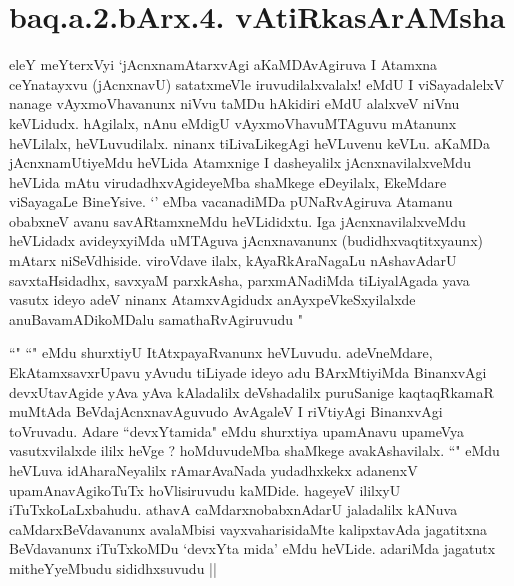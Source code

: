 \section*{baq.a.2.bArx.4. vAtiRkasArAMsha}


\begin{center}
\end{center}


\begin{artha}
eleY meYterxVyi `jAcnxnamAtarxvAgi aKaMDAvAgiruva I Atamxna ceYnatayxvu 
(jAcnxnavU) satatxmeVle iruvudilalxvalalx! eMdU I viSayadalelxV nanage 
vAyxmoVhavanunx niVvu taMDu hAkidiri eMdU alalxveV niVnu keVLidudx. hAgilalx, 
nAnu eMdigU vAyxmoVhavuMTAguvu mAtanunx heVLilalx, heVLuvudilalx. ninanx 
tiLivaLikegAgi heVLuvenu keVLu. aKaMDa jAcnxnamUtiyeMdu heVLida Atamxnige I 
dasheyalilx jAcnxnavilalxveMdu heVLida mAtu virudadhxvAgideyeMba shaMkege 
eDeyilalx, EkeMdare viSayagaLe BineYsive. `\stext' eMba vacanadiMDa 
pUNaRvAgiruva Atamanu obabxneV avanu savARtamxneMdu heVLididxtu. Iga 
jAcnxnavilalxveMdu heVLidadx avideyxyiMda uMTAguva jAcnxnavanunx 
(budidhxvaqtitxyaunx) mAtarx niSeVdhiside. viroVdave ilalx, kAyaRkAraNagaLu 
nAshavAdarU savxtaHsidadhx, savxyaM parxkAsha, parxmANadiMda tiLiyalAgada yava 
vasutx ideyo adeV ninanx AtamxvAgidudx anAyxpeVkeSxyilalxde anuBavamADikoMDalu 
samathaRvAgiruvudu "
\end{artha}

\begin{artha}
``\stext"  ``\stext" eMdu shurxtiyU ItAtxpayaRvanunx heVLuvudu. adeVneMdare, 
EkAtamxsavxrUpavu yAvudu tiLiyade ideyo adu BArxMtiyiMda BinanxvAgi  
devxUtavAgide  yAva yAva kAladalilx deVshadalilx puruSanige kaqtaqRkamaR muMtAda 
BeVdajAcnxnavAguvudo AvAgaleV I riVtiyAgi BinanxvAgi toVruvadu. Adare 
``devxYtamida" eMdu shurxtiya upamAnavu upameVya vasutxvilalxde ililx heVge ? 
hoMduvudeMba shaMkege avakAshavilalx. ``\stext" eMdu heVLuva idAharaNeyalilx 
rAmarAvaNada yudadhxkekx adanenxV upamAnavAgikoTuTx hoVlisiruvudu kaMDide. 
hageyeV ililxyU iTuTxkoLaLxbahudu. athavA caMdarxnobabxnAdarU jaladalilx kANuva 
caMdarxBeVdavanunx avalaMbisi vayxvaharisidaMte kalipxtavAda jagatitxna 
BeVdavanunx iTuTxkoMDu `devxYta mida' eMdu heVLide. adariMda jagatutx 
mitheYyeMbudu sididhxsuvudu || 
\end{artha}

